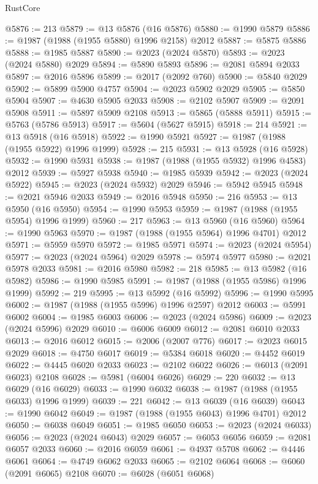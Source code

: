 \begin{lexlean}{RustCore}
\begin{coremodule}
@5876 := 213
@5879 := @13 @5876 (@16 @5876)
@5880 := @1990 @5879
@5886 := @1987 (@1988 (@1955 @5880) @1996 @2158) @2012
@5887 := @5875 @5886
@5888 := @1985 @5887
@5890 := @2023 (@2024 @5870)
@5893 := @2023 (@2024 @5880) @2029
@5894 := @5890 @5893
@5896 := @2081 @5894 @2033
@5897 := @2016 @5896
@5899 := @2017 (@2092 @760)
@5900 := @5840 @2029
@5902 := @5899 @5900 @4757
@5904 := @2023 @5902 @2029
@5905 := @5850 @5904
@5907 := @4630 @5905 @2033
@5908 := @2102 @5907
@5909 := @2091 @5908
@5911 := @5897 @5909 @2108
@5913 := @5865 (@5888 @5911)
@5915 := @5763 (@5786 @5913)
@5917 := @5604 (@5627 @5915)
@5918 := 214
@5921 := @13 @5918 (@16 @5918)
@5922 := @1990 @5921
@5927 := @1987 (@1988 (@1955 @5922) @1996 @1999)
@5928 := 215
@5931 := @13 @5928 (@16 @5928)
@5932 := @1990 @5931
@5938 := @1987 (@1988 (@1955 @5932) @1996 @4583) @2012
@5939 := @5927 @5938
@5940 := @1985 @5939
@5942 := @2023 (@2024 @5922)
@5945 := @2023 (@2024 @5932) @2029
@5946 := @5942 @5945
@5948 := @2021 @5946 @2033
@5949 := @2016 @5948
@5950 := 216
@5953 := @13 @5950 (@16 @5950)
@5954 := @1990 @5953
@5959 := @1987 (@1988 (@1955 @5954) @1996 @1999)
@5960 := 217
@5963 := @13 @5960 (@16 @5960)
@5964 := @1990 @5963
@5970 := @1987 (@1988 (@1955 @5964) @1996 @4701) @2012
@5971 := @5959 @5970
@5972 := @1985 @5971
@5974 := @2023 (@2024 @5954)
@5977 := @2023 (@2024 @5964) @2029
@5978 := @5974 @5977
@5980 := @2021 @5978 @2033
@5981 := @2016 @5980
@5982 := 218
@5985 := @13 @5982 (@16 @5982)
@5986 := @1990 @5985
@5991 := @1987 (@1988 (@1955 @5986) @1996 @1999)
@5992 := 219
@5995 := @13 @5992 (@16 @5992)
@5996 := @1990 @5995
@6002 := @1987 (@1988 (@1955 @5996) @1996 @2597) @2012
@6003 := @5991 @6002
@6004 := @1985 @6003
@6006 := @2023 (@2024 @5986)
@6009 := @2023 (@2024 @5996) @2029
@6010 := @6006 @6009
@6012 := @2081 @6010 @2033
@6013 := @2016 @6012
@6015 := @2006 (@2007 @776)
@6017 := @2023 @6015 @2029
@6018 := @4750 @6017
@6019 := @5384 @6018
@6020 := @4452 @6019
@6022 := @4445 @6020 @2033
@6023 := @2102 @6022
@6026 := @6013 (@2091 @6023) @2108
@6028 := @5981 (@6004 @6026)
@6029 := 220
@6032 := @13 @6029 (@16 @6029)
@6033 := @1990 @6032
@6038 := @1987 (@1988 (@1955 @6033) @1996 @1999)
@6039 := 221
@6042 := @13 @6039 (@16 @6039)
@6043 := @1990 @6042
@6049 := @1987 (@1988 (@1955 @6043) @1996 @4701) @2012
@6050 := @6038 @6049
@6051 := @1985 @6050
@6053 := @2023 (@2024 @6033)
@6056 := @2023 (@2024 @6043) @2029
@6057 := @6053 @6056
@6059 := @2081 @6057 @2033
@6060 := @2016 @6059
@6061 := @4937 @5708
@6062 := @4446 @6061
@6064 := @4749 @6062 @2033
@6065 := @2102 @6064
@6068 := @6060 (@2091 @6065) @2108
@6070 := @6028 (@6051 @6068)

\end{coremodule}
\end{lexlean}
